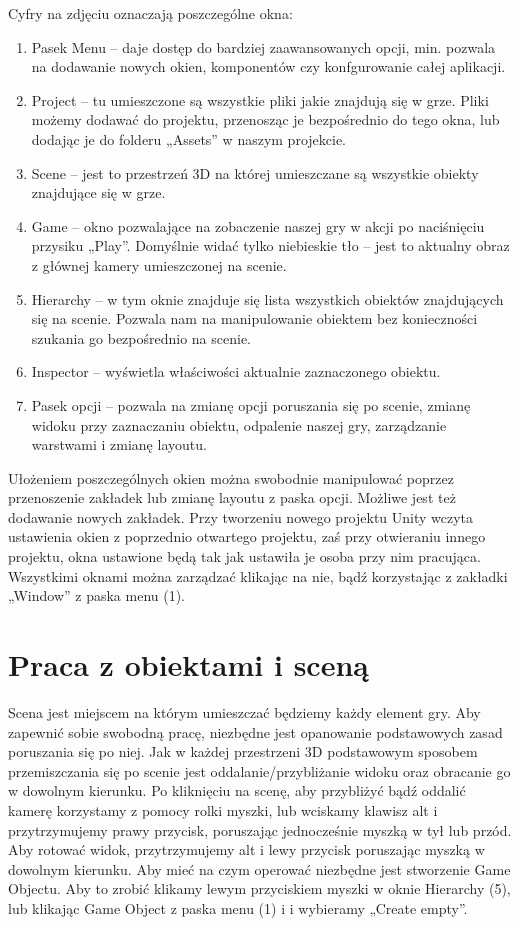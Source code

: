 \documentclass[brudnopis]{xmgr}
\begin{document}
Cyfry na zdjęciu oznaczają poszczególne okna: 

\begin{enumerate}
  \item Pasek Menu – daje dostęp do bardziej zaawansowanych opcji, min. pozwala na dodawanie nowych okien, komponentów czy konfgurowanie całej aplikacji.
  \item  Project – tu umieszczone są wszystkie pliki jakie znajdują się w grze. Pliki możemy dodawać do projektu, przenosząc je bezpośrednio do tego okna, lub dodając je do folderu „Assets” w naszym projekcie. 
  \item Scene – jest to przestrzeń 3D na której umieszczane są wszystkie obiekty znajdujące się w grze. 
  \item Game – okno pozwalające na zobaczenie naszej gry w akcji po naciśnięciu przysiku „Play”. Domyślnie widać tylko niebieskie tło – jest to aktualny obraz z głównej kamery umieszczonej na scenie. 
  \item Hierarchy – w tym oknie znajduje się lista wszystkich obiektów znajdujących się na scenie. Pozwala nam na manipulowanie obiektem bez konieczności szukania go bezpośrednio na scenie. 
  \item Inspector – wyświetla właściwości aktualnie zaznaczonego obiektu.
  \item  Pasek opcji – pozwala na zmianę opcji poruszania się po scenie, zmianę widoku przy zaznaczaniu obiektu, odpalenie naszej gry, zarządzanie warstwami i zmianę layoutu.
\end{enumerate}

 Ułożeniem poszczególnych okien można swobodnie manipulować poprzez przenoszenie zakładek lub zmianę layoutu z paska opcji. Możliwe jest też dodawanie nowych zakładek. Przy tworzeniu nowego projektu Unity wczyta ustawienia okien z poprzednio otwartego projektu, zaś przy otwieraniu innego projektu, okna ustawione będą tak jak ustawiła je osoba przy nim pracująca. Wszystkimi oknami można zarządzać klikając na nie, bądź korzystając z zakładki „Window” z paska menu (1). 

\section{Praca z obiektami i sceną} 

Scena jest miejscem na którym umieszczać będziemy każdy element gry. Aby zapewnić sobie swobodną pracę, niezbędne jest opanowanie podstawowych zasad poruszania się po niej. Jak w każdej przestrzeni 3D podstawowym sposobem przemiszczania się po scenie jest oddalanie/przybliżanie widoku oraz obracanie go w dowolnym kierunku. Po kliknięciu na scenę, aby przybliżyć bądź oddalić kamerę korzystamy z pomocy rolki myszki, lub wciskamy klawisz alt i przytrzymujemy prawy przycisk, poruszając jednocześnie myszką w tył lub przód. Aby rotować widok, przytrzymujemy alt i lewy przycisk poruszając myszką w dowolnym kierunku. Aby mieć na czym operować niezbędne jest stworzenie Game Objectu. Aby to zrobić klikamy lewym przyciskiem myszki w oknie Hierarchy (5), lub klikając Game Object z paska menu (1) i i wybieramy „Create empty”. 
\end{document}

